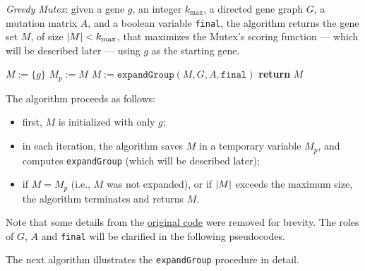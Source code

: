 \begin{algorithm}[H]
    \caption{
        \textit{Greedy Mutex}: given a gene $g$, an integer $k_\mathrm{max}$, a directed gene graph $G$, a mutation matrix $A$, and a boolean variable \texttt{final}, the algorithm returns the gene set $M$, of size $\left|M\right| < k_\mathrm{max}$, that maximizes the Mutex's scoring function --- which will be described later --- using $g$ as the starting gene.
    }

        \label{greedy_mutex}
    \begin{algorithmic}[1]
            \State $M := \{g\}$
            \Do
                \State $M_p := M$
                \State $M := \texttt{expandGroup}(M, G, A, \texttt{final})$ 
             
            \State \textbf{return} $M$
        \EndFunction
    \end{algorithmic}
\end{algorithm}

The algorithm proceeds as follows:

\begin{itemize}
    \item first, $M$ is initialized with only $g$;
    \item in each iteration, the algorithm saves $M$ in a temporary variable $M_p$, and computes \texttt{expandGroup} (which will be described later);
    \item if $M = M_p$ (i.e., $M$ was not expanded), or if $\left|M\right|$ exceeds the maximum size, the algorithm terminates and returns $M$.
\end{itemize}

Note that some details from the \href{https://github.com/PathwayAndDataAnalysis/mutex}{original code} were removed for brevity. The roles of $G$, $A$ and \texttt{final} will be clarified in the following pseudocodes.

The next algorithm illustrates the \texttt{expandGroup} procedure in detail.

